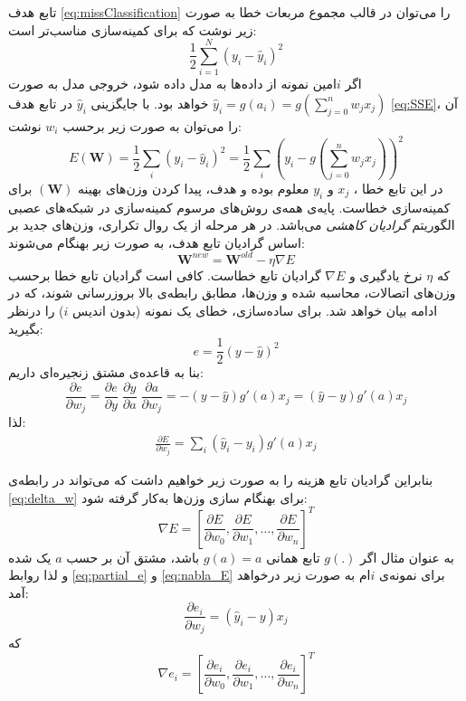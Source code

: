 \documentclass[11pt, twoside]{imsproc}
\let\LTRfootnote\footnoteA
\begin{document}
تابع هدف
\eqref{eq:missClassification}
را می‌توان در قالب مجموع مربعات خطا به صورت زیر نوشت که برای کمینه‌سازی مناسب‌تر است:
\begin{equation}
\frac{1}{2}\sum_{i=1}^N(y_i-\hat{y}_i)^2
\label{eq:SSE}
\end{equation}
اگر  $i$امین نمونه از داده‌ها به مدل داده شود، خروجی مدل به صورت
$\hat{y}_i = g(a_i) = g(\sum_{j=0}^n w_j x_j)$
خواهد بود. با جایگزینی
$\hat{y}_i$
در  تابع هدف
\eqref{eq:SSE}،
آن را می‌توان به صورت زیر برحسب
$w_i$
نوشت:
\begin{equation}
E(\mathbf{W}) = \frac{1}{2}\sum_{i}(y_i-\hat{y}_i)^2 = \frac{1}{2}\sum_{i}\left(y_i-g(\sum_{j=0}^n w_j x_j)\right)^2
\label{eq:cost_w}
\end{equation}
در این تابع خطا%
\LTRfootnote{Error Function}،‌
$x_j$
و
$y_i$
معلوم بوده و هدف، پیدا کردن وزن‌های بهینه
$(\mathbf{W})$
برای کمینه‌سازی خطاست.
پایه‌ی همه‌ی روش‌های مرسوم کمینه‌سازی در شبکه‌های عصبی الگوریتم
\textit{گرادیان کاهشی}
می‌باشد. در هر مرحله از یک روال تکراری، وزن‌های جدید بر اساس گرادیان تابع هدف، به صورت زیر بهنگام می‌شوند:
\begin{equation}
\mathbf{W}^{new} = \mathbf{W}^{old} - \eta\nabla E
\label{eq:delta_w}
\end{equation}
که
$\eta$
نرخ یادگیری و
$\nabla E$
گرادیان تابع خطاست. کافی است گرادیان تابع خطا برحسب وزن‌های اتصالات، محاسبه شده و وزن‌ها، مطابق رابطه‌ی بالا بروزرسانی شوند، که در ادامه بیان خواهد شد.
برای ساده‌سازی، خطای یک نمونه (بدون اندیس $i$)‌ را  درنظر بگیرید:
$$e =\frac{1}{2}(y-\hat{y})^2 $$
بنا به قاعده‌ی مشتق زنجیره‌ای داریم:
\begin{equation}\label{eq:partial_e}
      \frac{\partial e}{\partial w_{j}}
      =\frac{\partial e}{\partial y}\;
      \frac{\partial y}{\partial a}\;
      \frac{\partial a}{\partial w_{j}}
      =-(y-\hat{y})g'(a)x_j=(\hat{y}-y)g'(a)x_j
 \end{equation}
 لذا:
 \begin{align}\label{eq:partial_E}
\frac{\partial E}{\partial w_j} = \sum_i (\hat{y}_i-y_i)g'(a)x_j
\end{align}

بنابراین گرادیان تابع هزینه را به صورت زیر خواهیم داشت که می‌تواند در رابطه‌ی
\eqref{eq:delta_w}
برای بهنگام سازی وزن‌ها به‌کار گرفته شود:
\begin{equation}\label{eq:nabla_E}
\nabla E = \left[\frac{\partial E}{\partial w_0},\frac{\partial E}{\partial w_1},\dots,\frac{\partial E}{\partial w_n}\right]^T
\end{equation}
به عنوان مثال اگر 
$g(.)$
تابع همانی
$g(a)=a$
  باشد، مشتق آن بر حسب
  $a$
  یک شده و لذا روابط
  \eqref{eq:partial_e} 
  و
  \eqref{eq:nabla_E}   
برای نمونه‌ی $i$ام  به صورت زیر درخواهد آمد:
  \begin{equation}\label{eq:partial_e_gaa}
\frac{\partial e_i}{\partial w_{j}}
      =(\hat{y}_i-y)x_j
 \end{equation}
 که 
   \begin{equation}\label{eq:nabla_e_gaa}
\nabla e_i = \left[\frac{\partial e_i}{\partial w_0},\frac{\partial e_i}{\partial w_1},\dots,\frac{\partial e_i}{\partial w_n}\right]^T
 \end{equation}
\end{document}
